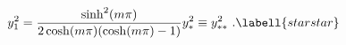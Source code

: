 \begin{equation}
  y_1^2 = \frac{\sinh^2(m\pi)}{2\cosh(m\pi)(\cosh(m\pi)-1)}y_*^2
  \equiv y_{**}^2\ .
\labell{starstar}
\end{equation}


